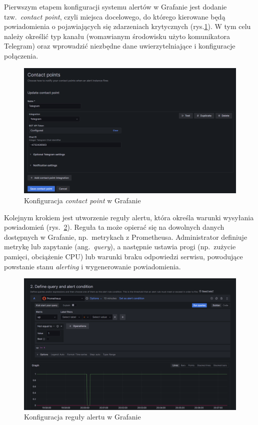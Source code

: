 \documentclass{article}
\begin{document}
Pierwszym etapem konfiguracji systemu alertów w Grafanie jest dodanie tzw.\ \textit{contact point}, czyli miejsca docelowego, do którego kierowane będą powiadomienia o pojawiających się zdarzeniach krytycznych (rys.\ref{fig:contact-point-grafana}). W tym celu należy określić typ kanału (womawianym środowisku użyto komunikatora Telegram) oraz wprowadzić niezbędne dane uwierzytelniające i konfiguracje połączenia.

\begin{figure}[H] \centering \includegraphics[width=0.9\linewidth]{konfiguracjaContactPointGrafana.png} \caption{Konfiguracja \textit{contact point} w Grafanie} \label{fig:contact-point-grafana} \end{figure}

Kolejnym krokiem jest utworzenie reguły alertu, która określa warunki wysyłania powiadomień (rys.~\ref{fig:alert-rule-grafana}). Reguła ta może opierać się na dowolnych danych dostępnych w Grafanie, np.\ metrykach z Prometheusa. Administrator definiuje metrykę lub zapytanie (ang.\ \textit{query}), a następnie ustawia progi (np.\ zużycie pamięci, obciążenie CPU) lub warunki braku odpowiedzi serwisu, powodujące powstanie stanu \textit{alerting} i wygenerowanie powiadomienia.

\begin{figure}[H] \centering \includegraphics[width=0.9\linewidth]{konfiguracjaAlertGrafana.png} \caption{Konfiguracja reguły alertu w Grafanie} \label{fig:alert-rule-grafana} \end{figure}
\end{document}
